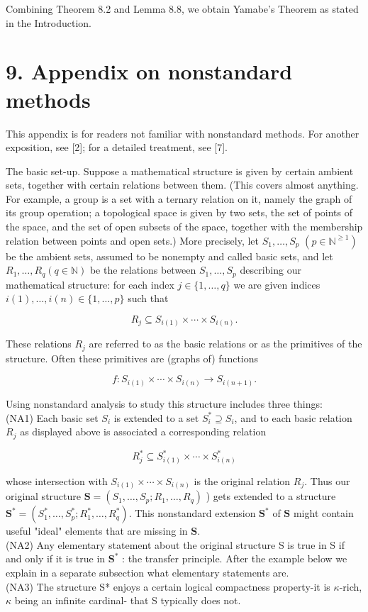 \documentclass[10pt]{article}
\begin{document}
Combining Theorem 8.2 and Lemma 8.8, we obtain Yamabe's Theorem as stated in the Introduction.

\section*{9. Appendix on nonstandard methods}
This appendix is for readers not familiar with nonstandard methods. For another exposition, see [2]; for a detailed treatment, see [7].

The basic set-up. Suppose a mathematical structure is given by certain ambient sets, together with certain relations between them. (This covers almost anything. For example, a group is a set with a ternary relation on it, namely the graph of its group operation; a topological space is given by two sets, the set of points of the space, and the set of open subsets of the space, together with the membership relation between points and open sets.) More precisely, let $S_{1}, \ldots, S_{p}$ $\left(p \in \mathbb{N}^{\geq 1}\right)$ be the ambient sets, assumed to be nonempty and called basic sets, and let $R_{1}, \ldots, R_{q}(q \in \mathbb{N})$ be the relations between $S_{1}, \ldots, S_{p}$ describing our mathematical structure: for each index $j \in\{1, \ldots, q\}$ we are given indices $i(1), \ldots, i(n) \in\{1, \ldots, p\}$ such that

$$
R_{j} \subseteq S_{i(1)} \times \cdots \times S_{i(n)} .
$$

These relations $R_{j}$ are referred to as the basic relations or as the primitives of the structure. Often these primitives are (graphs of) functions

$$
f: S_{i(1)} \times \cdots \times S_{i(n)} \rightarrow S_{i(n+1)} .
$$

Using nonstandard analysis to study this structure includes three things:\\
(NA1) Each basic set $S_{i}$ is extended to a set $S_{i}^{*} \supseteq S_{i}$, and to each basic relation $R_{j}$ as displayed above is associated a corresponding relation

$$
R_{j}^{*} \subseteq S_{i(1)}^{*} \times \cdots \times S_{i(n)}^{*}
$$

whose intersection with $S_{i(1)} \times \cdots \times S_{i(n)}$ is the original relation $R_{j}$. Thus our original structure $\mathbf{S}=\left(S_{1}, \ldots, S_{p} ; R_{1}, \ldots, R_{q}\right)$ ) gets extended to a structure\\
$\mathbf{S}^{*}=\left(S_{1}^{*}, \ldots, S_{p}^{*} ; R_{1}^{*}, \ldots, R_{q}^{*}\right)$. This nonstandard extension $\mathbf{S}^{*}$ of $\mathbf{S}$ might contain useful "ideal" elements that are missing in $\mathbf{S}$.\\
(NA2) Any elementary statement about the original structure S is true in S if and only if it is true in $\mathbf{S}^{*}$ : the transfer principle. After the example below we explain in a separate subsection what elementary statements are.\\
(NA3) The structure S* enjoys a certain logical compactness property-it is $\kappa$-rich, $\kappa$ being an infinite cardinal- that S typically does not.
\end{document}
